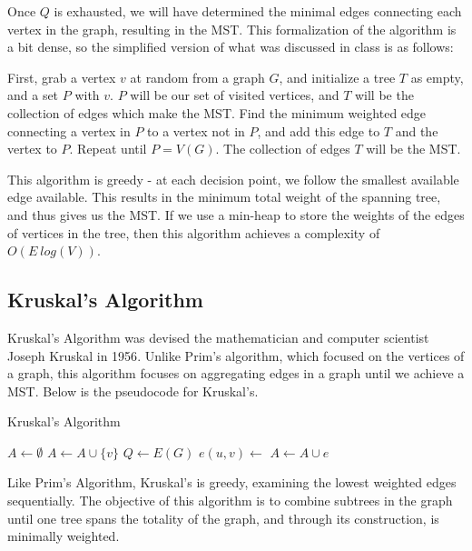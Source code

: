 Once $Q$ is exhausted, we will have determined the minimal edges connecting each vertex in the graph, resulting in the MST. This formalization of the algorithm is a bit dense, so the simplified version of what was discussed in class is as follows:

First, grab a vertex $v$ at random from a graph $G$, and initialize a tree $T$ as empty, and a set $P$ with $v$. $P$ will be our set of visited vertices, and $T$ will be the collection of edges which make the MST. Find the minimum weighted edge connecting a vertex in $P$ to a vertex not in $P$, and add this edge to $T$ and the vertex to $P$. Repeat until $P = V(G)$. The collection of edges $T$ will be the MST.

This algorithm is greedy - at each decision point, we follow the smallest available edge available. This results in the minimum total weight of the spanning tree, and thus gives us the MST. If we use a min-heap to store the weights of the edges of vertices in the tree, then this algorithm achieves a complexity of $O(E~log(V))$. 

\subsection{Kruskal's Algorithm}
Kruskal's Algorithm was devised the mathematician and computer scientist Joseph Kruskal in 1956\cite{KruskalsAlgo}. Unlike Prim's algorithm, which focused on the vertices of a graph, this algorithm focuses on aggregating edges in a graph until we achieve a MST. Below is the pseudocode for Kruskal's.

\begin{algorithm}
    \DontPrintSemicolon
    \caption{Kruskal's Algorithm}


    $A \gets \emptyset$\;
     {
        $A \gets A \cup \{v\}$\;
    }
    $Q \gets E(G)$\;
     {
        $e(u, v) \gets$ \;
         {
            \;
            $A \gets A \cup e$\;
        }
    }
\end{algorithm}
Like Prim's Algorithm, Kruskal's is greedy, examining the lowest weighted edges sequentially. The objective of this algorithm is to combine subtrees in the graph until one tree spans the totality of the graph, and through its construction, is minimally weighted. 

